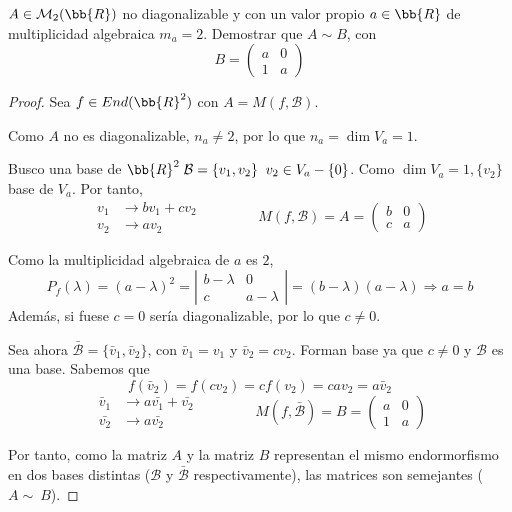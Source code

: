 \begin{ejercicio}
    $A\in \mathcal{M}_2(\bb{R})$ no diagonalizable y con un valor propio $a\in\bb{R}$ de multiplicidad algebraica $m_a=2$. Demostrar que $A\sim B$, con
    \begin{equation*}
        B=\left( \begin{array}{cc}
            a & 0 \\
            1 & a
        \end{array}\right)
    \end{equation*}

    \begin{proof}
        Sea $f\in End(\bb{R}^2)$ con $A=M(f, \mathcal{B})$.
        
        Como $A$ no es diagonalizable, $n_a \neq 2$, por lo que $n_a = \dim V_a = 1$.

        Busco una base de $\bb{R}^2 \; \mathcal{B} = \{v_1, v_2\}\;\; v_2 \in V_a - \{0\}$. Como $\dim V_a = 1, \{v_2\}$ base de $V_a$. Por tanto,
        $$\begin{array}{rl}
            v_1 & \longrightarrow bv_1 + cv_2 \\
            v_2 & \longrightarrow av_2
        \end{array} \qquad \qquad 
        M(f, \mathcal{B}) = A = \left( \begin{array}{cc}
            b & 0 \\
            c & a
        \end{array} \right)$$

        Como la multiplicidad algebraica de $a$ es $2$, $$P_f(\lambda) = (a-\lambda)^2 = \left| \begin{array}{cc}
            b-\lambda & 0 \\
            c & a-\lambda
        \end{array} \right| = (b-\lambda)(a-\lambda) \Longrightarrow a = b$$
        Además, si fuese $c=0$ sería diagonalizable, por lo que $c\neq 0$.

        Sea ahora $\bar{\mathcal{B}} = \{\bar{v}_1,\bar{v}_2\}$, con $\bar{v}_1=v_1$ y $\bar{v}_2 = cv_2$. Forman base ya que $c\neq 0$ y $\mathcal{B}$ es una base.
        Sabemos que $$f(\bar{v}_2) = f(cv_2) = cf(v_2) = cav_2 = a\bar{v}_2$$
        $$\begin{array}{rl}
            \bar{v}_1 & \longrightarrow a\bar{v_1} + \bar{v_2} \\
            \bar{v_2} & \longrightarrow a\bar{v_2}
        \end{array} \qquad \qquad 
        M(f, \bar{\mathcal{B}}) = B = \left( \begin{array}{cc}
            a & 0 \\
            1 & a
        \end{array} \right)$$

        Por tanto, como la matriz $A$ y la matriz $B$ representan el mismo endormorfismo en dos bases distintas ($\mathcal{B}$ y $\bar{\mathcal{B}}$ respectivamente), las matrices son semejantes ($A\sim ~B$).
    \end{proof}
\end{ejercicio}


